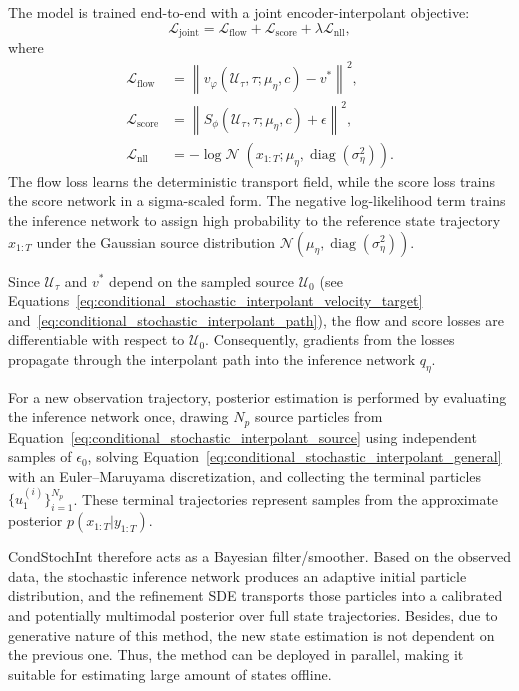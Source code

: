 The model is trained end-to-end with a joint encoder-interpolant objective:
\begin{equation}
    \mathcal{L}_{\text{joint}}
    =
    \mathcal{L}_{\text{flow}}
    +\mathcal{L}_{\text{score}}
    +\lambda\mathcal{L}_{\text{nll}},
    \label{eq:conditional_stochastic_interpolant_loss}
\end{equation}
where
\begin{align}
    \mathcal{L}_{\text{flow}}
    &=
    \left\|
        v_\varphi(\mathcal{U}_\tau,\tau;\mu_\eta,c)-v^*
    \right\|^2, \\
    \mathcal{L}_{\text{score}}
    &=
    \left\|
        S_\phi(\mathcal{U}_\tau,\tau;\mu_\eta,c)+\epsilon
    \right\|^2, \\
    \mathcal{L}_{\text{nll}}
    &=
    -\log
    \mathcal{N}\;\left(
        x_{1:T};
        \mu_\eta,
        \operatorname{diag}(\sigma_\eta^2)
    \right).
\end{align}
The flow loss learns the deterministic transport field, while the score loss trains the score network in a sigma-scaled form. The negative log-likelihood term trains the inference network to assign high probability to the reference state trajectory $x_{1:T}$ under the Gaussian source distribution $\mathcal{N}(\mu_\eta,\operatorname{diag}(\sigma_\eta^2))$.

Since $\mathcal{U}_\tau$ and $v^*$ depend on the sampled source $\mathcal{U}_0$ (see Equations~\ref{eq:conditional_stochastic_interpolant_velocity_target} and~\ref{eq:conditional_stochastic_interpolant_path}), the flow and score losses are differentiable with respect to $\mathcal{U}_0$. Consequently, gradients from the losses propagate through the interpolant path into the inference network $q_\eta$.

For a new observation trajectory, posterior estimation is performed by evaluating the inference network once, drawing $N_p$ source particles from Equation~\ref{eq:conditional_stochastic_interpolant_source} using independent samples of $\epsilon_0$, solving Equation~\ref{eq:conditional_stochastic_interpolant_general} with an Euler--Maruyama discretization, and collecting the terminal particles $\{u_1^{(i)}\}_{i=1}^{N_p}$. These terminal trajectories represent samples from the approximate posterior $p(x_{1:T}| y_{1:T})$.

CondStochInt therefore acts as a Bayesian filter/smoother. Based on the observed data, the stochastic inference network produces an adaptive initial particle distribution, and the refinement \ac{SDE} transports those particles into a calibrated and potentially multimodal posterior over full state trajectories. Besides, due to generative nature of this method, the new state estimation is not dependent on the previous one. Thus, the method can be deployed in parallel, making it suitable for estimating large amount of states offline.

